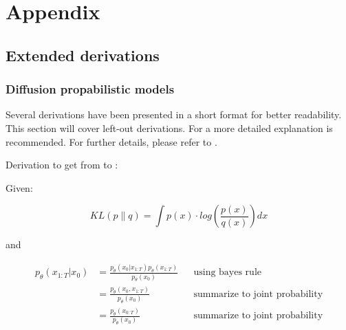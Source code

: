 \renewcommand\thesection{A.\arabic{section}}
\renewcommand\thefigure{A-\arabic{figure}}   
\renewcommand\thetable{A-\arabic{table}}   
\renewcommand\theequation{A.\arabic{equation}}   

\chapter{Appendix} 
\label{ch:Appendix}

\section{Extended derivations}
\label{A:derivations}

\subsection[]{Diffusion propabilistic models}
Several derivations have been presented in a short format for better readability.
This section will cover left-out derivations.
For a more detailed explanation \cite{weng2021WhatAreDiffusion, outlier2022DiffusionModelsPaper} is recommended.
For further details, please refer to \cite{sohl-dickstein2015DeepUnsupervisedLearning, ho2020DenoisingDiffusionProbabilistic}.

Derivation to get from  to :

Given:

\begin{equation}
    \label{eqn:kl-divergence_appendix}
    KL(p\parallel q) = \int p(x)\cdot log(\frac{p(x)}{q(x)})dx
\end{equation}

and

\begin{equation}
    \label{eqn:simplify1}
	\begin{align}
    p_\theta(x_{1:T}|x_0) &= \frac{p_\theta(x_0|x_{1:T})p_\theta(x_{1:T})}{p_\theta(x_0)} && \textrm{using bayes rule}\\
	&= \frac{p_\theta(x_0,x_{1:T})}{p_\theta(x_{0})} && \textrm{summarize to joint probability}\\
	&= \frac{p_\theta(x_{0:T})}{p_\theta(x_{0})} && \textrm{summarize to joint probability}\\
\end{align}
\end{equation}

